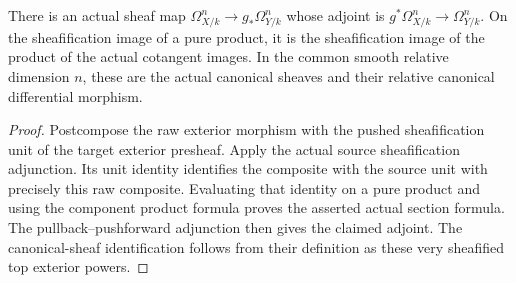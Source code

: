 \begin{definition}\label{sc0-exterior-cotangent-morphism:sheaf}
\leanok
{}
There is an actual sheaf map $\Omega^n_{X/k}\to g_*\Omega^n_{Y/k}$ whose adjoint is $g^*\Omega^n_{X/k}\to\Omega^n_{Y/k}$. On the sheafification image of a pure product, it is the sheafification image of the product of the actual cotangent images. In the common smooth relative dimension $n$, these are the actual canonical sheaves and their relative canonical differential morphism.
\end{definition}
\begin{proof}
Postcompose the raw exterior morphism with the pushed sheafification unit of the target exterior presheaf. Apply the actual source sheafification adjunction. Its unit identity identifies the composite with the source unit with precisely this raw composite. Evaluating that identity on a pure product and using the component product formula proves the asserted actual section formula. The pullback--pushforward adjunction then gives the claimed adjoint. The canonical-sheaf identification follows from their definition as these very sheafified top exterior powers.
\end{proof}
